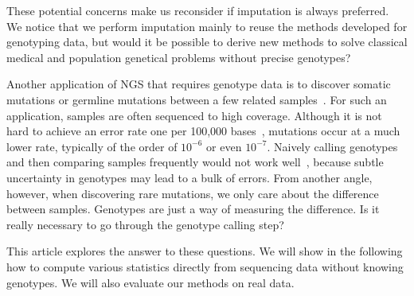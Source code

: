 \documentclass{bioinfo}
\begin{document}
These potential concerns make us reconsider if imputation is always preferred.
We notice that we perform imputation mainly to reuse the methods developed for
genotyping data, but would it be possible to derive new methods to solve
classical medical and population genetical problems without precise genotypes?

Another application of NGS that requires genotype data is to discover somatic
mutations or germline mutations between a few related
samples~\citep{Ley:2008ve,Mardis:2009qf,Shah:2009cr,Pleasance:2010bh,Pleasance:2010dq,Roach:2010oq,Conrad:2011kx}.
For such an application, samples are often sequenced to high coverage.
Although it is not hard to achieve an error rate one per 100,000
bases~\citep{Bentley:2008cr}, mutations occur at a much lower rate, typically
of the order of $10^{-6}$ or even $10^{-7}$. Naively calling genotypes and then
comparing samples frequently would not work well~\citep{Ajay:2011fk}, because subtle uncertainty in
genotypes may lead to a bulk of errors. From another angle, however, when
discovering rare mutations, we only care about the difference between samples.
Genotypes are just a way of measuring the difference. Is it really necessary to
go through the genotype calling step?

This article explores the answer to these questions. We will show in the
following how to compute various statistics directly from sequencing data
without knowing genotypes. We will also evaluate our methods on real data.
\end{document}
